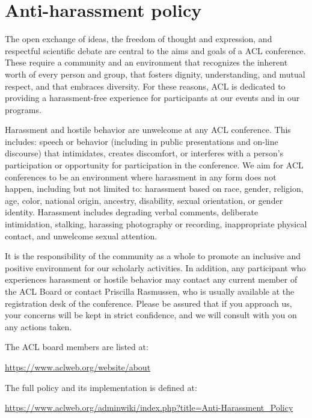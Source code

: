 \chapter[Anti-harassment policy]{Anti-harassment policy}
\thispagestyle{emptyheader}
\setheaders{}{}

The open exchange of ideas, the freedom of thought and expression, and
respectful scientific debate are central to the aims and goals of a
ACL conference. These require a community and an environment that
recognizes the inherent worth of every person and group, that fosters
dignity, understanding, and mutual respect, and that embraces
diversity. For these reasons, ACL is dedicated to providing a
harassment-free experience for participants at our events and in our
programs. 

Harassment and hostile behavior are unwelcome at any ACL
conference. This includes: speech or behavior (including in public
presentations and on-line discourse) that intimidates, creates
discomfort, or interferes with a person’s participation or opportunity
for participation in the conference. We aim for ACL conferences to
be an environment where harassment in any form does not happen,
including but not limited to: harassment based on race, gender,
religion, age, color, national origin, ancestry, disability, sexual
orientation, or gender identity. Harassment includes degrading verbal
comments, deliberate intimidation, stalking, harassing photography or
recording, inappropriate physical contact, and unwelcome sexual
attention. 

It is the responsibility of the community as a whole to promote an
inclusive and positive environment for our scholarly activities. In
addition, any participant who experiences harassment or hostile
behavior may contact any current member of the ACL Board or contact
Priscilla Rasmussen, who is usually available at the registration desk
of the conference. Please be assured that if you approach us, your
concerns will be kept in strict confidence, and we will consult with
you on any actions taken. 

The ACL board members are listed at:

\url{https://www.aclweb.org/website/about}

The full policy and its implementation is defined at:

\url{https://www.aclweb.org/adminwiki/index.php?title=Anti-Harassment_Policy}
